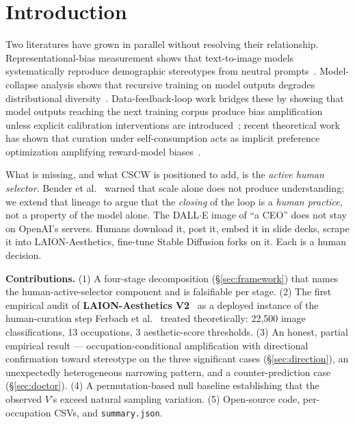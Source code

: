 \documentclass[manuscript, nonacm, screen, review]{acmart}
\begin{document}

\maketitle

\section{Introduction}

Two literatures have grown in parallel without resolving their relationship. Representational-bias measurement shows that text-to-image models systematically reproduce demographic stereotypes from neutral prompts~\cite{bianchi2023easily,luccioni2023stable}. Model-collapse analysis shows that recursive training on model outputs degrades distributional diversity~\cite{shumailov2024curse,gerstgrasser2024inevitable}. Data-feedback-loop work bridges these by showing that model outputs reaching the next training corpus produce bias amplification unless explicit calibration interventions are introduced~\cite{taori2022data}; recent theoretical work has shown that curation under self-consumption acts as implicit preference optimization amplifying reward-model biases~\cite{ferbach2024selfconsuming}.

What is missing, and what CSCW is positioned to add, is the \emph{active human selector}. Bender et al.~\cite{bender2021dangers} warned that scale alone does not produce understanding; we extend that lineage to argue that the \emph{closing} of the loop is a \emph{human practice}, not a property of the model alone. The DALL\(\cdot\)E image of ``a CEO'' does not stay on OpenAI's servers. Humans download it, post it, embed it in slide decks, scrape it into LAION-Aesthetics, fine-tune Stable Diffusion forks on it. Each is a human decision.

\textbf{Contributions.} (1) A four-stage decomposition (\S\ref{sec:framework}) that names the human-active-selector component and is falsifiable per stage. (2) The first empirical audit of \textbf{LAION-Aesthetics V2}~\cite{schuhmann2022laion} as a deployed instance of the human-curation step Ferbach et al.~\cite{ferbach2024selfconsuming} treated theoretically: 22{,}500 image classifications, 13 occupations, 3 aesthetic-score thresholds. (3) An honest, partial empirical result --- occupation-conditional amplification with directional confirmation toward stereotype on the three significant cases (\S\ref{sec:direction}), an unexpectedly heterogeneous narrowing pattern, and a counter-prediction case (\S\ref{sec:doctor}). (4) A permutation-based null baseline establishing that the observed $V$'s exceed natural sampling variation. (5) Open-source code, per-occupation CSVs, and \texttt{summary.json}.
\end{document}
